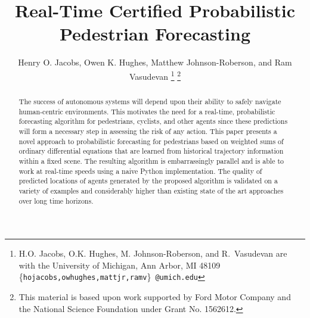 \documentclass[letterpaper,10pt,conference]{ieeetran}
\begin{document}
\title{Real-Time Certified Probabilistic Pedestrian Forecasting}

\author{Henry O. Jacobs, Owen K. Hughes, Matthew Johnson-Roberson, and Ram Vasudevan
 \thanks{ H.O. Jacobs, O.K. Hughes, M. Johnson-Roberson, and R.~Vasudevan are with the University of Michigan, Ann Arbor, MI 48109
{\scriptsize \{\texttt{hojacobs,owhughes,mattjr,ramv}\}~\texttt{@umich.edu}}}
\thanks{This material is based upon work supported by Ford Motor Company and the National Science Foundation under Grant No. 1562612.}
}



\maketitle

\begin{abstract}
The success of autonomous systems will depend upon their ability to safely navigate human-centric environments.
This motivates the need for a real-time, probabilistic forecasting algorithm for pedestrians, cyclists, and other agents since these predictions will form a necessary step in assessing the risk of any action.
This paper presents a novel approach to probabilistic forecasting for pedestrians based on weighted sums of ordinary differential equations that are learned from historical trajectory information within a fixed scene.
The resulting algorithm is embarrassingly parallel and is able to work at real-time speeds using a naive Python implementation.
The quality of predicted locations of agents generated by the proposed algorithm is validated on a variety of examples and considerably higher than existing state of the art approaches over long time horizons.
\end{abstract}
\end{document}
